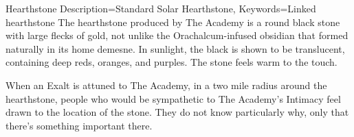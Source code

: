 \begin{Merit}{Hearthstone}{
    Description=Standard Solar Hearthstone,
    Keywords=Linked
}{hearthstone}
The hearthstone produced by The Academy is a round black stone with large
flecks of gold, not unlike the Orachalcum-infused obsidian that formed
naturally in its home demesne. In sunlight, the black is shown to be
translucent, containing deep reds, oranges, and purples. The stone feels warm
to the touch.

When an Exalt is attuned to The Academy, in a two mile radius around the
hearthstone, people who would be sympathetic to The Academy's Intimacy feel
drawn to the location of the stone. They do not know particularly why, only
that there's something important there.
\end{Merit}


